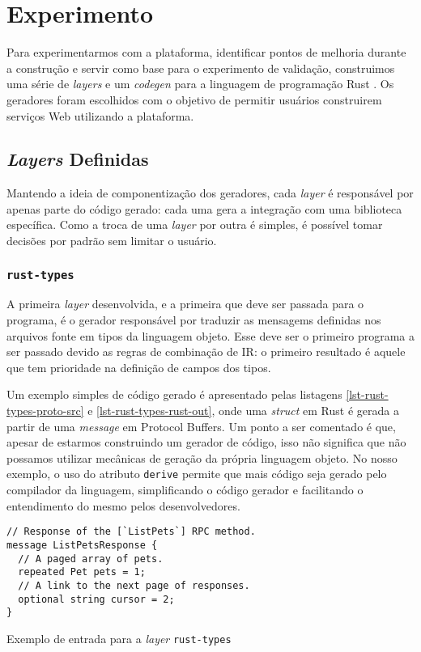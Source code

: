 \section{Experimento}

Para experimentarmos com a plataforma, identificar pontos de melhoria durante a construção e
servir como base para o experimento de validação, construimos uma série de \textit{layers} e
um \textit{codegen} para a linguagem de programação Rust \cite{rust:site}. Os geradores foram
escolhidos com o objetivo de permitir usuários construirem serviços Web utilizando a plataforma.

\subsection{\textit{Layers} Definidas}

Mantendo a ideia de componentização dos geradores, cada \textit{layer} é responsável por apenas
parte do código gerado: cada uma gera a integração com uma biblioteca específica. Como a troca
de uma \textit{layer} por outra é simples, é possível tomar decisões por padrão sem limitar o
usuário.

\subsubsection{\texttt{rust-types}}

A primeira \textit{layer} desenvolvida, e a primeira que deve ser passada para o programa, é
o gerador responsável por traduzir as mensagems definidas nos arquivos fonte em tipos da linguagem
objeto. Esse deve ser o primeiro programa a ser passado devido as regras de combinação de IR: o
primeiro resultado é aquele que tem prioridade na definição de campos dos tipos.

Um exemplo simples de código gerado é apresentado pelas listagens \ref{lst-rust-types-proto-src}
e \ref{lst-rust-types-rust-out}, onde uma \textit{struct} em Rust é gerada a partir de uma
\textit{message} em Protocol Buffers. Um ponto a ser comentado é que, apesar de estarmos construindo
um gerador de código, isso não significa que não possamos utilizar mecânicas de geração da própria
linguagem objeto. No nosso exemplo, o uso do atributo \texttt{derive} permite que mais código seja
gerado pelo compilador da linguagem, simplificando o código gerador e facilitando o entendimento
do mesmo pelos desenvolvedores.

\begin{listing}
\begin{verbatim}
// Response of the [`ListPets`] RPC method.
message ListPetsResponse {
  // A paged array of pets.
  repeated Pet pets = 1;
  // A link to the next page of responses.
  optional string cursor = 2;
}
\end{verbatim}
\caption{Exemplo de entrada para a \textit{layer} \texttt{rust-types}}
\label{lst-rust-types-proto-src}
\end{listing}

